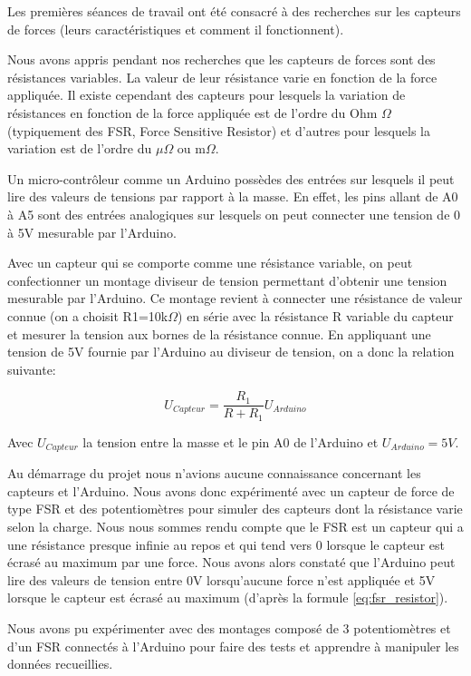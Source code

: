 \documentclass{polytech/polytech}
\begin{document}
Les premières séances de travail ont été consacré à des recherches sur les capteurs de forces (leurs caractéristiques et comment il fonctionnent). 

Nous avons appris pendant nos recherches que les capteurs de forces sont des résistances variables. La valeur de leur résistance varie en fonction de la force appliquée. Il existe cependant des capteurs pour lesquels la variation de résistances en fonction de la force appliquée est de l'ordre du Ohm $\Omega$ (typiquement des FSR, Force Sensitive Resistor) et d'autres pour lesquels la variation est de l'ordre du $\mu \Omega$ ou $\mathrm{m} \Omega$.

Un micro-contrôleur comme un Arduino possèdes des entrées sur lesquels il peut lire des valeurs de tensions par rapport à la masse. En effet, les pins allant de A0 à A5 sont des entrées analogiques sur lesquels on peut connecter une tension de 0 à 5V mesurable par l'Arduino. 

Avec un capteur qui se comporte comme une résistance variable, on peut confectionner un montage diviseur de tension permettant d'obtenir une tension mesurable par l'Arduino. Ce montage revient à connecter une résistance de valeur connue (on a choisit R1=10k$\Omega$) en série avec la résistance R variable du capteur et mesurer la tension aux bornes de la résistance connue.  En appliquant une tension de 5V fournie par l'Arduino au diviseur de tension, on a donc la relation suivante:

\begin{equation}
\label{eq:fsr_resistor}
U_{Capteur}= \frac{R_1}{ R + R_1} U_{Arduino} 
\end{equation}
 
 Avec $U_{Capteur}$ la tension entre la masse et le pin A0 de l'Arduino et $U_{Arduino}=5V$.
 
Au démarrage du projet nous n'avions aucune connaissance concernant les capteurs et l'Arduino. Nous avons donc expérimenté avec un capteur de force de type FSR et des potentiomètres pour simuler des capteurs dont la résistance varie selon la charge. Nous nous sommes rendu compte que le FSR est un capteur qui a une résistance presque infinie au repos et qui tend vers 0 lorsque le capteur est écrasé au maximum par une force. Nous avons alors constaté que l'Arduino peut lire des valeurs de tension entre 0V lorsqu'aucune force n'est appliquée et 5V lorsque le capteur est écrasé au maximum (d'après la formule \eqref{eq:fsr_resistor}).

Nous avons pu expérimenter avec des montages composé de 3 potentiomètres et d'un FSR connectés à l'Arduino pour faire des tests et apprendre à manipuler les données recueillies.
\end{document}
